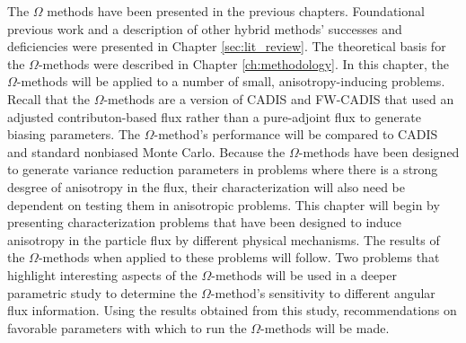 The $\Omega$ methods have been presented in the previous chapters.
Foundational previous work and a description of other hybrid methods' successes
and deficiencies were presented in Chapter \ref{sec:lit_review}. The
theoretical basis for the $\Omega$-methods were described in Chapter
\ref{ch:methodology}. In this chapter, the $\Omega$-methods will be applied to a
number of small, anisotropy-inducing problems. Recall that the $\Omega$-methods
are a version of CADIS and FW-CADIS that used an adjusted contributon-based flux
rather than a pure-adjoint flux to generate biasing parameters.
The $\Omega$-method's performance
will be compared to CADIS and standard nonbiased Monte Carlo.
Because the $\Omega$-methods have been designed to generate variance reduction
parameters in problems
where there is a strong desgree of anisotropy in the flux, their
characterization will also need be dependent on testing them in anisotropic
problems.
This chapter will begin by presenting characterization problems
that have been designed to induce anisotropy in the particle flux by
different physical mechanisms. The results of the $\Omega$-methods when
applied to these problems will follow. Two problems that highlight interesting
aspects of the $\Omega$-methods will be used in a deeper parametric study to
determine the $\Omega$-method's sensitivity to different angular flux
information. Using the results obtained from this study,
recommendations on favorable
parameters with which to run the $\Omega$-methods will be made. \\


